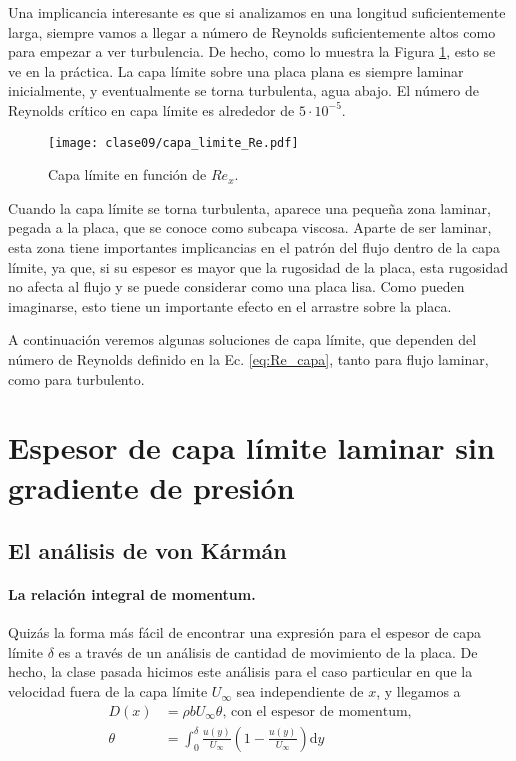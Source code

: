 Una implicancia interesante es que si analizamos en una longitud suficientemente larga, siempre vamos a llegar a número de Reynolds suficientemente altos como para empezar a ver turbulencia.
De hecho, como lo muestra la Figura \ref{fig:capa_limite_Re}, esto se ve en la práctica. 
La capa límite sobre una placa plana es siempre laminar inicialmente, y eventualmente se torna turbulenta, agua abajo.
El número de Reynolds crítico en capa límite es alrededor de $5\cdot10^{-5}$.
%
\begin{figure}[!h]
\centering
\texttt{[image: clase09/capa\_limite\_Re.pdf]}
\caption{Capa límite en función de $Re_x$.}
\label{fig:capa_limite_Re}
\end{figure}

Cuando la capa límite se torna turbulenta, aparece una pequeña zona laminar, pegada a la placa, que se conoce como subcapa viscosa.
Aparte de ser laminar, esta zona tiene importantes implicancias en el patrón del flujo dentro de la capa límite, ya que, si su espesor es mayor que la rugosidad de la placa, esta rugosidad no afecta al flujo y se puede considerar como una placa lisa. 
Como pueden imaginarse, esto tiene un importante efecto en el arrastre sobre la placa.

A continuación veremos algunas soluciones de capa límite, que dependen del número de Reynolds definido en la Ec. \eqref{eq:Re_capa}, tanto para flujo laminar, como para turbulento.

\section*{Espesor de capa límite laminar sin gradiente de presión}

\subsection*{El análisis de von Kármán}
\paragraph*{La relación integral de momentum.}

Quizás la forma más fácil de encontrar una expresión para el espesor de capa límite $\delta$ es a través de un análisis de cantidad de movimiento de la placa.
De hecho, la clase pasada hicimos este análisis para el caso particular en que la velocidad fuera de la capa límite $U_\infty$ sea independiente de $x$, y llegamos a
%
\begin{align}
D(x) &= \rho bU_\infty\theta\text{, con el espesor de momentum,}\nonumber\\
\theta &= \int_0^\delta\frac{u(y)}{U_\infty}\left(1-\frac{u(y)}{U_\infty}\right)\mathrm{d}y
\end{align}

